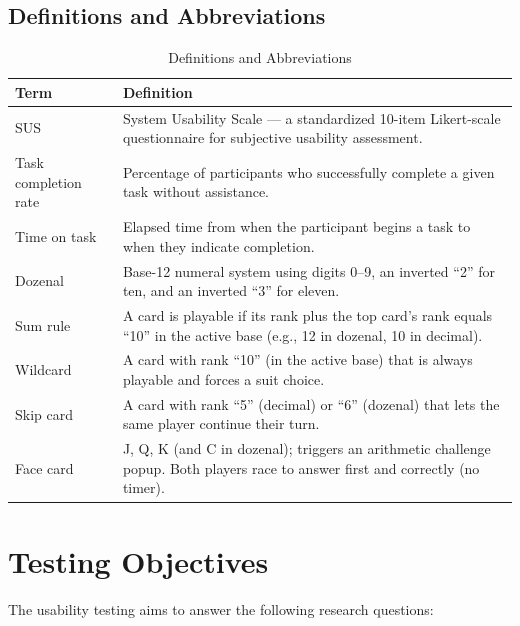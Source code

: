\documentclass[12pt, titlepage]{article}
\begin{document}
\subsection{Definitions and Abbreviations}

\begin{table}[H]
\centering
\caption{Definitions and Abbreviations}
\begin{tabularx}{\textwidth}{lX}
\toprule
\textbf{Term} & \textbf{Definition} \\
\midrule
SUS & System Usability Scale --- a standardized 10-item Likert-scale questionnaire for subjective usability assessment. \\
Task completion rate & Percentage of participants who successfully complete a given task without assistance. \\
Time on task & Elapsed time from when the participant begins a task to when they indicate completion. \\
Dozenal & Base-12 numeral system using digits 0--9, an inverted ``2'' for ten, and an inverted ``3'' for eleven. \\
Sum rule & A card is playable if its rank plus the top card's rank equals ``10'' in the active base (e.g., 12 in dozenal, 10 in decimal). \\
Wildcard & A card with rank ``10'' (in the active base) that is always playable and forces a suit choice. \\
Skip card & A card with rank ``5'' (decimal) or ``6'' (dozenal) that lets the same player continue their turn. \\
Face card & J, Q, K (and C in dozenal); triggers an arithmetic challenge popup. Both players race to answer first and correctly (no timer). \\
\bottomrule
\end{tabularx}
\end{table}


\section{Testing Objectives}\label{sec:objectives}

The usability testing aims to answer the following research questions:
\end{document}
